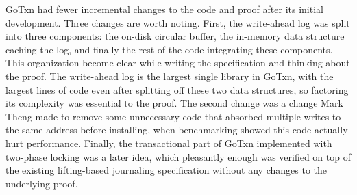 GoTxn had fewer incremental changes to the code and proof after its initial
development. Three changes are worth noting. First, the write-ahead log was
split into three components: the on-disk circular buffer, the in-memory data
structure caching the log, and finally the rest of the code integrating these
components. This organization become clear while writing the specification and
thinking about the proof. The write-ahead log is the largest single library in
GoTxn, with the largest lines of code even after splitting off these two data
structures, so factoring its complexity was essential to the proof. The second
change was a change Mark Theng made to remove some unnecessary code that
absorbed multiple writes to the same address before installing, when
benchmarking showed this code actually hurt performance. Finally, the
transactional part of GoTxn implemented with two-phase locking was a later idea,
which pleasantly enough was verified on top of the existing lifting-based
journaling specification without any changes to the underlying proof.

